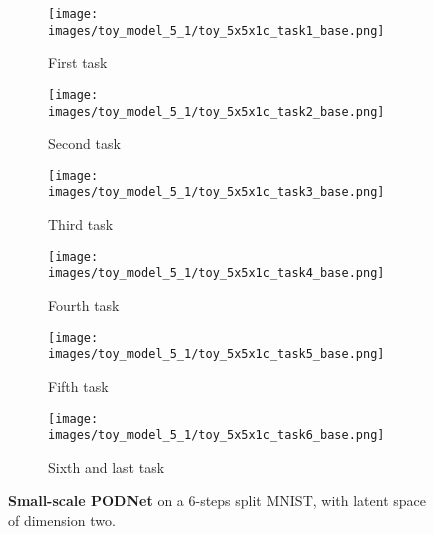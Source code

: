 \begin{figure}
    \centering
    \begin{subfigure}{.33\textwidth}
        \centering
        \texttt{[image: images/toy\_model\_5\_1/toy\_5x5x1c\_task1\_base.png]}
        \caption{First task}
        \label{fig:ghost_toy_6steps_base_1}
    \end{subfigure}%
    \begin{subfigure}{.33\textwidth}
        \centering
        \texttt{[image: images/toy\_model\_5\_1/toy\_5x5x1c\_task2\_base.png]}
        \caption{Second task}
        \label{fig:ghost_toy_6steps_base_2}
    \end{subfigure}
    \begin{subfigure}{.33\textwidth}
        \centering
        \texttt{[image: images/toy\_model\_5\_1/toy\_5x5x1c\_task3\_base.png]}
        \caption{Third task}
        \label{fig:ghost_toy_6steps_base_3}
    \end{subfigure}

    \begin{subfigure}{.33\textwidth}
        \centering
        \texttt{[image: images/toy\_model\_5\_1/toy\_5x5x1c\_task4\_base.png]}
        \caption{Fourth task}
        \label{fig:ghost_toy_6steps_base_4}
    \end{subfigure}
    \begin{subfigure}{.33\textwidth}
        \centering
        \texttt{[image: images/toy\_model\_5\_1/toy\_5x5x1c\_task5\_base.png]}
        \caption{Fifth task}
        \label{fig:ghost_toy_6steps_base_5}
    \end{subfigure}
    \begin{subfigure}{.30\textwidth}
        \centering
        \texttt{[image: images/toy\_model\_5\_1/toy\_5x5x1c\_task6\_base.png]}
        \caption{Sixth and last task}
        \label{fig:ghost_toy_6steps_base_6}
    \end{subfigure}

    \caption{\textbf{Small-scale PODNet} on a 6-steps split MNIST, with latent space of dimension two.}
    \label{fig:ghost_toy_6steps_base}
\end{figure}
